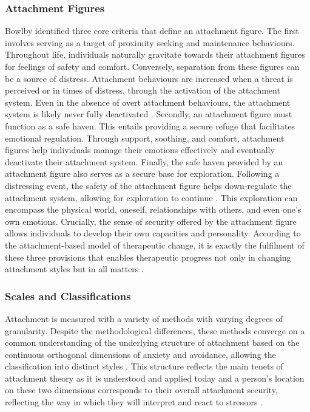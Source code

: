 \documentclass[12pt]{report}
\begin{document}
\subsubsection*{Attachment Figures}
Bowlby \cite{Bowlby1969attachment} identified three core criteria that define an attachment figure.
The first involves serving as a target of proximity seeking and maintenance behaviours.
Throughout life, individuals naturally gravitate towards their attachment figures for feelings of safety and comfort.
Conversely, separation from these figures can be a source of distress.
Attachment behaviours are increased when a threat is perceived or in times of distress, through the activation of the attachment system.
Even in the absence of overt attachment behaviours, the attachment system is likely never fully deactivated \cite{Bowlby1969attachment}.
Secondly, an attachment figure must function as a safe haven. This entails providing a secure refuge that facilitates emotional regulation.
Through support, soothing, and comfort, attachment figures help individuals manage their emotions effectively and eventually deactivate their attachment system.
Finally, the safe haven provided by an attachment figure also serves as a secure base for exploration.
Following a distressing event, the safety of the attachment figure helps down-regulate the attachment system, allowing for exploration to continue \cite{Bowlby1969attachment}.
This exploration can encompass the physical world, oneself, relationships with others, and even one's own emotions.
Crucially, the sense of security offered by the attachment figure allows individuals to develop their own capacities and personality.
According to the attachment-based model of therapeutic change, it is exactly the fulfilment of these three provisions that enables therapeutic progress not only in changing attachment styles but in all matters \cite{Bowlby1969attachment, Mikulincer2013}.

\subsubsection*{Scales and Classifications}
Attachment is measured with a variety of methods with varying degrees of granularity. Despite the methodological differences, these methods converge on a common understanding of the underlying structure of attachment based on the continuous orthogonal dimensions of anxiety and avoidance, allowing the classification into distinct styles \cite{Brennan1998,Mikulincer2013}.
This structure reflects the main tenets of attachment theory as it is understood and applied today and a person's location on these two dimensions corresponds to their overall attachment security, reflecting the way in which they will interpret and react to stressors \cite{Mikulincer2007}.
\end{document}
